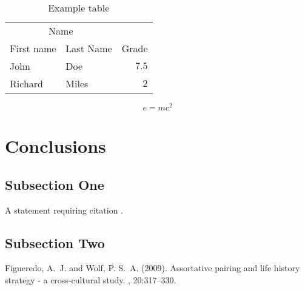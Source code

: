\documentclass[oneside,twocolumn]{article}
\begin{document}
\begin{table}
  \caption{Example table}
  \centering
  \begin{tabular}{llr}
    \toprule
    \multicolumn{2}{c}{Name} \\
    \cmidrule(r){1-2}
    First name & Last Name & Grade \\
    \midrule
    John & Doe & $7.5$ \\
    Richard & Miles & $2$ \\
    \bottomrule
  \end{tabular}
\end{table}

\blindtext %

\begin{equation}
  \label{eq:emc}
  e = mc^2
\end{equation}

\blindtext %


\section{Conclusions}

\subsection{Subsection One}

A statement requiring citation \cite{Figueredo:2009dg}.
\blindtext %

\subsection{Subsection Two}

\blindtext %


\begin{thebibliography}{99} %
  
  Figueredo, A.~J. and Wolf, P. S.~A. (2009).
  \newblock Assortative pairing and life history strategy - a cross-cultural
  study.
  , 20:317--330.
  
\end{thebibliography}

\end{document}
